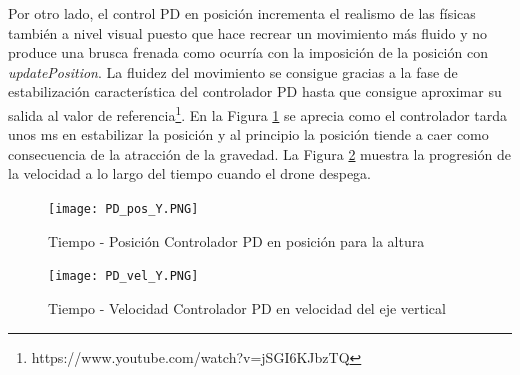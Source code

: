 Por otro lado, el control PD en posición incrementa el realismo de las físicas también a nivel visual puesto que hace recrear un movimiento más fluido y no produce una brusca frenada como ocurría con la imposición de la posición con \textit{updatePosition}. La fluidez del movimiento se consigue gracias a la fase de estabilización característica del controlador PD hasta que consigue aproximar su salida al valor de referencia\footnote{https://www.youtube.com/watch?v=jSGI6KJbzTQ}. En la Figura \ref{fig:pos-ejeY} se aprecia como el controlador tarda unos ms en estabilizar la posición y al principio la posición tiende a caer como consecuencia de la atracción de la gravedad. La Figura \ref{fig:vel-ejeY} muestra la progresión de la velocidad a lo largo del tiempo cuando el drone despega.

\begin{figure}[h!]
    \centering
    \texttt{[image: PD\_pos\_Y.PNG]}
    \caption{Tiempo - Posición Controlador PD en posición para la altura}
    \label{fig:pos-ejeY}
\end{figure}

\begin{figure}[h!]
    \centering
    \texttt{[image: PD\_vel\_Y.PNG]}
    \caption{Tiempo - Velocidad Controlador PD en velocidad del eje vertical}
    \label{fig:vel-ejeY}
\end{figure}

